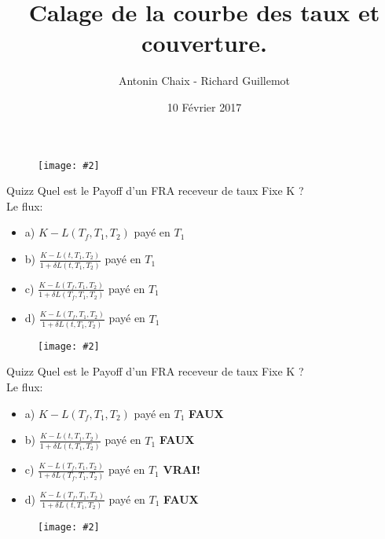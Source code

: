 \documentclass{beamer}
\title[Produits dérivés de taux]{Calage de la courbe des taux et couverture.}
\author{Antonin Chaix - Richard Guillemot}
\institute{Master IFMA}
\date{10 Février 2017}
\newcommand{\FIG}[2]{\texttt{[image: \#2]}}
\begin{document}
\begin{frame}
\titlepage
\begin{figure}[h]
\centering \FIG{5cm}{figures/UPMC_IFMA.jpg}
\end{figure}

\end{frame}

\begin{frame}{Quizz}
Quel est le Payoff d'un FRA receveur de taux Fixe K ?\\
\vspace{0.5cm}
Le flux:
\begin{itemize}
\item a) $K - L(T_f,T_{1},T_{2})$ payé en $T_1$
\item b) $\frac{K - L(t,T_{1},T_{2})}{1+\delta  L(t,T_{1},T_{2})}$ payé en $T_1$
\item c) $\frac{K - L(T_f,T_{1},T_{2})}{1+\delta  L(T_f,T_{1},T_{2})}$ payé en $T_1$
\item d) $\frac{K - L(T_f,T_{1},T_{2})}{1+\delta  L(t,T_{1},T_{2})}$ payé en $T_1$
\end{itemize}
\begin{figure}[h]
\FIG{10cm}{figures/schema_fra.jpg}
\end{figure}
\end{frame}


\begin{frame}{Quizz}
Quel est le Payoff d'un FRA receveur de taux Fixe K ?\\
\vspace{0.5cm}
Le flux:
\begin{itemize}
\item a) $K - L(T_f,T_{1},T_{2})$ payé en $T_1$ \textbf{\color{red}FAUX}
\item b) $\frac{K - L(t,T_{1},T_{2})}{1+\delta  L(t,T_{1},T_{2})}$ payé en $T_1$ \textbf{\color{red}FAUX}
\item c) $\frac{K - L(T_f,T_{1},T_{2})}{1+\delta  L(T_f,T_{1},T_{2})}$ payé en $T_1$ \textbf{\color{green}VRAI!}
\item d) $\frac{K - L(T_f,T_{1},T_{2})}{1+\delta  L(t,T_{1},T_{2})}$ payé en $T_1$ \textbf{\color{red}FAUX}
\end{itemize}
\begin{figure}[h]
\FIG{10cm}{figures/schema_fra.jpg}
\end{figure}

\end{frame}
\end{document}

